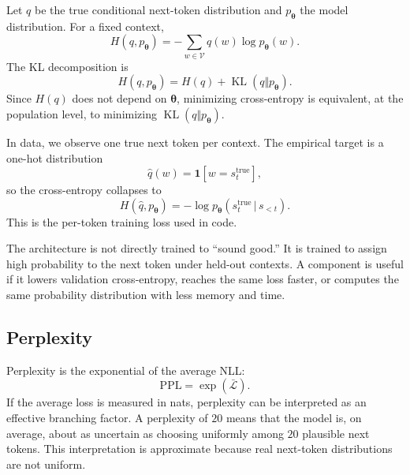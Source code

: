 \documentclass[11pt,a4paper]{article}
\theoremstyle{definition}
\theoremstyle{plain}
\newcommand{\vtheta}{\bm{\theta}}
\newcommand{\loss}{\mathcal{L}}
\newcommand{\ind}{\mathbf{1}}
\newcommand{\given}{\,|\,}
\DeclareMathOperator{\KL}{KL}
\begin{document}
Let $q$ be the true conditional next-token distribution and $p_{\vtheta}$ the model distribution. For a fixed context,
\begin{equation}\label{eq:cross_entropy_def}
    H(q,p_{\vtheta})
    =-\sum_{w\in\mathcal{V}}q(w)\log p_{\vtheta}(w).
\end{equation}
The KL decomposition is
\begin{equation}\label{eq:entropy_decomposition}
    H(q,p_{\vtheta})=H(q)+\KL(q\Vert p_{\vtheta}).
\end{equation}
Since $H(q)$ does not depend on $\vtheta$, minimizing cross-entropy is equivalent, at the population level, to minimizing $\KL(q\Vert p_{\vtheta})$.

In data, we observe one true next token per context. The empirical target is a one-hot distribution
\begin{equation}
    \hat q(w)=\ind[w=s^{\mathrm{true}}_t],
\end{equation}
so the cross-entropy collapses to
\begin{equation}
    H(\hat q,p_{\vtheta})=-\log p_{\vtheta}(s^{\mathrm{true}}_t\given s_{<t}).
\end{equation}
This is the per-token training loss used in code.

\begin{motivationbox}
The architecture is not directly trained to ``sound good.'' It is trained to assign high probability to the next token under held-out contexts. A component is useful if it lowers validation cross-entropy, reaches the same loss faster, or computes the same probability distribution with less memory and time.
\end{motivationbox}

\subsection{Perplexity}

Perplexity is the exponential of the average NLL:
\begin{equation}\label{eq:perplexity}
    \mathrm{PPL}=\exp(\bar{\loss}).
\end{equation}
If the average loss is measured in nats, perplexity can be interpreted as an effective branching factor. A perplexity of $20$ means that the model is, on average, about as uncertain as choosing uniformly among $20$ plausible next tokens. This interpretation is approximate because real next-token distributions are not uniform.
\end{document}
